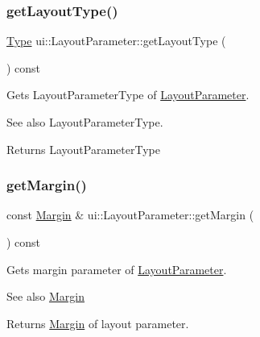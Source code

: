 \subsubsection{\texorpdfstring{get\+Layout\+Type()}{getLayoutType()}\hspace{0.1cm}{\footnotesize\ttfamily [2/2]}}
{\footnotesize\ttfamily \hyperlink{classui_1_1LayoutParameter_a1b01e01e7e6fc3de80f2e6d07fae806e}{Type} ui\+::\+Layout\+Parameter\+::get\+Layout\+Type (\begin{DoxyParamCaption}{ }\end{DoxyParamCaption}) const}

Gets Layout\+Parameter\+Type of \hyperlink{classui_1_1LayoutParameter}{Layout\+Parameter}.

\begin{DoxySeeAlso}{See also}
Layout\+Parameter\+Type. 
\end{DoxySeeAlso}
\begin{DoxyReturn}{Returns}
Layout\+Parameter\+Type 
\end{DoxyReturn}
\mbox{\label{classui_1_1LayoutParameter_a73e27e60494106c1629f22f868c7be27}} 
\subsubsection{\texorpdfstring{get\+Margin()}{getMargin()}\hspace{0.1cm}{\footnotesize\ttfamily [1/2]}}
{\footnotesize\ttfamily const \hyperlink{classui_1_1Margin}{Margin} \& ui\+::\+Layout\+Parameter\+::get\+Margin (\begin{DoxyParamCaption}{ }\end{DoxyParamCaption}) const}

Gets margin parameter of \hyperlink{classui_1_1LayoutParameter}{Layout\+Parameter}.

\begin{DoxySeeAlso}{See also}
\hyperlink{classui_1_1Margin}{Margin} 
\end{DoxySeeAlso}
\begin{DoxyReturn}{Returns}
\hyperlink{classui_1_1Margin}{Margin} of layout parameter. 
\end{DoxyReturn}
\mbox{\label{classui_1_1LayoutParameter_abeb9f29a89baa815f61107667a02b501}} 
